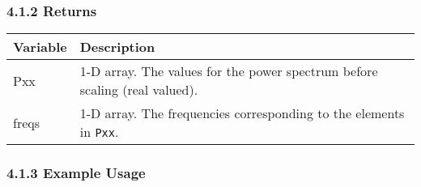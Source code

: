 \documentclass[]{article}
\begin{document}
\subsubsection{4.1.2 Returns}\label{returns}

\begin{longtable}[]{@{}ll@{}}
\toprule
\begin{minipage}[b]{0.15\columnwidth}\raggedright\strut
Variable\strut
\end{minipage} & \begin{minipage}[b]{0.80\columnwidth}\raggedright\strut
Description\strut
\end{minipage}\tabularnewline
\midrule
\endhead
\begin{minipage}[t]{0.15\columnwidth}\raggedright\strut
Pxx\strut
\end{minipage} & \begin{minipage}[t]{0.80\columnwidth}\raggedright\strut
1-D array. The values for the power spectrum before scaling (real
valued).\strut
\end{minipage}\tabularnewline
\begin{minipage}[t]{0.15\columnwidth}\raggedright\strut
freqs\strut
\end{minipage} & \begin{minipage}[t]{0.80\columnwidth}\raggedright\strut
1-D array. The frequencies corresponding to the elements in
\texttt{Pxx}.\strut
\end{minipage}\tabularnewline
\bottomrule
\end{longtable}

\subsubsection{4.1.3 Example Usage}\label{example-usage-2}
\end{document}
